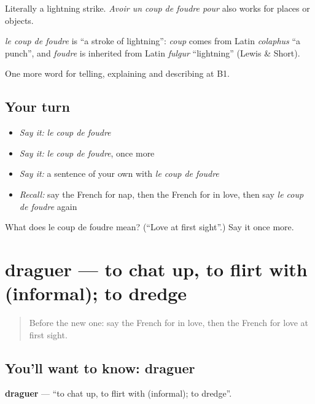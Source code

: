 Literally a lightning strike. \emph{Avoir un coup de foudre pour} also works for places or objects.

\begin{cousinweb}
\emph{le coup de foudre} is \textquotedblleft{}a stroke of lightning\textquotedblright{}: \emph{coup} comes from Latin \emph{colaphus} \textquotedblleft{}a punch\textquotedblright{}, and \emph{foudre} is inherited from Latin \emph{fulgur} \textquotedblleft{}lightning\textquotedblright{} (Lewis \& Short).
\end{cousinweb}

\begin{grammarlens}[title={What you've built}]
One more word for telling, explaining and describing at B1.
\end{grammarlens}

\subsection*{Your turn}
\begin{itemize}
\raggedright
  \item \emph{Say it:} \emph{le coup de foudre}
  \item \emph{Say it:} \emph{le coup de foudre}, once more
  \item \emph{Say it:} a sentence of your own with \emph{le coup de foudre}
  \item \emph{Recall:} say the French for nap, then the French for in love, then say \emph{le coup de foudre} again
\end{itemize}

\begin{tcolorbox}[breakable,colback=teal!4,colframe=teal!35!black,title={Before you move on}]
What does le coup de foudre mean? (\textquotedblleft{}Love at first sight\textquotedblright{}.) Say it once more.
\end{tcolorbox}
\section[draguer]{draguer — to chat up, to flirt with (informal); to dredge}

\label{lesson:FR-C487-draguer}



\begin{quote}
Before the new one: say the French for in love, then the French for love at first sight.
\end{quote}

\subsection*{You'll want to know: draguer}
\textbf{draguer} — \textquotedblleft{}to chat up, to flirt with (informal); to dredge\textquotedblright{}.

